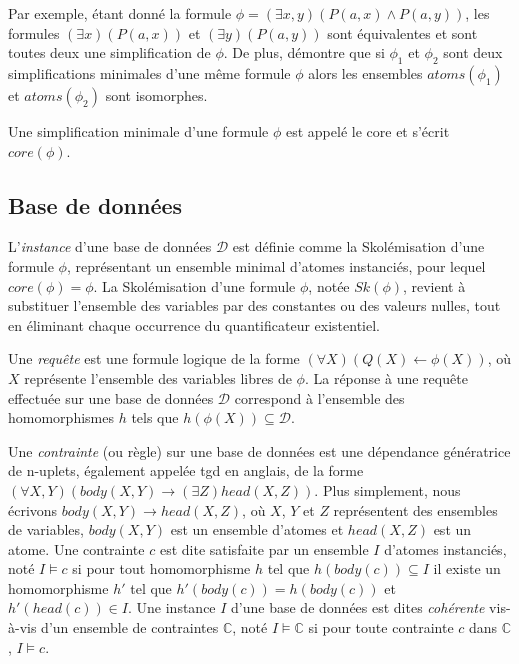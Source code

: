 Par exemple, étant donné la formule $\phi = (\exists x, y)(P(a, x) \land P(a, y))$, les formules $(\exists x)(P(a, x))$ et $(\exists y)(P(a, y))$ sont équivalentes et sont toutes deux une simplification de $\phi$.
De plus, \cite{chabinConsistentUpdatingDatabases2020} démontre que si $\phi_1$ et $\phi_2$ sont deux simplifications minimales d'une même formule $\phi$ alors les ensembles $atoms(\phi_1)$ et $atoms(\phi_2)$ sont isomorphes.

\begin{definition}[Core]
    Une simplification minimale d'une formule $\phi$ est appelé le \gls{core} et s'écrit $core(\phi)$.
\end{definition}

\subsection{Base de données}
\label{sec:update:pre:db}

\begin{definition}[Instance]
L'\emph{instance} d'une base de données $\mathcal{D}$ est définie comme la Skolémisation d'une formule $\phi$, représentant un ensemble minimal d'atomes instanciés, pour lequel $core(\phi) = \phi$.
La Skolémisation d'une formule $\phi$, notée $Sk(\phi)$, revient à substituer l'ensemble des variables par des constantes ou des valeurs nulles, tout en éliminant chaque occurrence du quantificateur existentiel.
\end{definition}

\begin{definition}[Requête]
Une \emph{requête} est une formule logique de la forme $(\forall X)(Q(X) \gets \phi(X))$, où $X$ représente l'ensemble des variables libres de $\phi$.
La réponse à une requête effectuée sur une base de données $\mathcal{D}$ correspond à l'ensemble des homomorphismes $h$ tels que $h(\phi(X)) \subseteq \mathcal{D}$.
\end{definition}

\begin{definition}[Contrainte]
Une \emph{contrainte} (ou règle) sur une base de données est une dépendance génératrice de n-uplets, également appelée \gls{tgd} en anglais, de la forme $(\forall X, Y)(body(X, Y) \to (\exists Z)head(X, Z))$.
Plus simplement, nous écrivons $body(X, Y) \to head(X, Z)$, où $X$, $Y$ et $Z$ représentent des ensembles de variables, $body(X, Y)$ est un ensemble d'atomes et $head(X, Z)$ est un atome.
Une contrainte $c$ est dite satisfaite par un ensemble $I$ d'atomes instanciés, noté $I \vDash c$ si pour tout homomorphisme $h$ tel que $h(body(c)) \subseteq I$ il existe un homomorphisme $h'$ tel que $h'(body(c)) = h(body(c))$ et $h'(head(c)) \in I$.
Une instance $I$ d'une base de données est dites \emph{cohérente} vis-à-vis d'un ensemble de contraintes $\mathbb{C}$, noté $I \vDash \mathbb{C}$ si pour toute contrainte $c$ dans $\mathbb{C}$, $I \vDash c$.
\end{definition}

